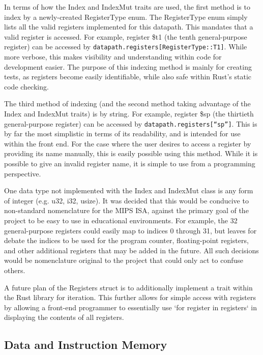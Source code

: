 \documentclass[
    paper=letter,
    parskip=half,
    fontsize=12pt,
    titlepage=firstiscover,
    toc=bibliography,
    numbers=endperiod
]{scrartcl}
\begin{document}
In terms of how the Index and IndexMut traits are used, the first method
is to index by a newly-created RegisterType enum. The RegisterType enum
simply lists all the valid registers implemented for this datapath. This
mandates that a valid register is accessed. For example, register \$t1
(the tenth general-purpose register) can be accessed by
\texttt{datapath.registers[RegisterType::T1]}. While more verbose, this
makes visibility and understanding within code for development easier.
The purpose of this indexing method is mainly for creating tests, as
registers become easily identifiable, while also safe within Rust's
static code checking.

The third method of indexing (and the second method taking advantage of
the Index and IndexMut traits) is by string. For example, register \$sp
(the thirtieth general-purpose register) can be accessed by
\texttt{datapath.registers[``sp'']}. This is by far the most simplistic
in terms of its readability, and is intended for use within the front
end. For the case where the user desires to access a register by
providing its name manually, this is easily possible using this method.
While it is possible to give an invalid register name, it is simple to
use from a programming perspective.

One data type not implemented with the Index and IndexMut class is any
form of integer (e.g. u32, i32, usize). It was decided that this would
be conducive to non-standard nomenclature for the MIPS ISA, against the
primary goal of the project to be easy to use in educational
environments. For example, the 32 general-purpose registers could easily
map to indices 0 through 31, but leaves for debate the indices to be
used for the program counter, floating-point registers, and other
additional registers that may be added in the future. All such decisions
would be nomenclature original to the project that could only act to
confuse others.


A future plan of the Registers struct is to additionally implement a
trait within the Rust library for iteration. This further allows for
simple access with registers by allowing a front-end programmer to
essentially use `for register in registers` in displaying the contents
of all registers.

\subsection{Data and Instruction Memory}
\end{document}
